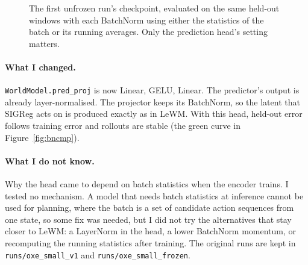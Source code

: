 \documentclass[10pt]{article}
\newcommand{\code}[1]{\texttt{\small #1}}
\begin{document}
\begin{figure}[H]
\centering
{}
\caption{The first unfrozen run's checkpoint, evaluated on the same held-out windows with
each BatchNorm using either the statistics of the batch or its running averages. Only the
prediction head's setting matters.}
\label{fig:bn}
\end{figure}


\paragraph{What I changed.} \code{WorldModel.pred\_proj} is now Linear, GELU, Linear. The
predictor's output is already layer-normalised. The projector keeps its BatchNorm, so the
latent that SIGReg acts on is produced exactly as in LeWM. With this head, held-out error
follows training error and rollouts are stable (the green curve in
Figure~\ref{fig:bncmp}).

\paragraph{What I do not know.} Why the head came to depend on batch statistics when the
encoder trains. I tested no mechanism. A model that needs batch statistics at inference
cannot be used for planning, where the batch is a set of candidate action sequences from
one state, so some fix was needed, but I did not try the alternatives that stay closer to
LeWM: a LayerNorm in the head, a lower BatchNorm momentum, or recomputing the running
statistics after training. The original runs are kept in \code{runs/oxe\_small\_v1} and
\code{runs/oxe\_small\_frozen}.
\end{document}
